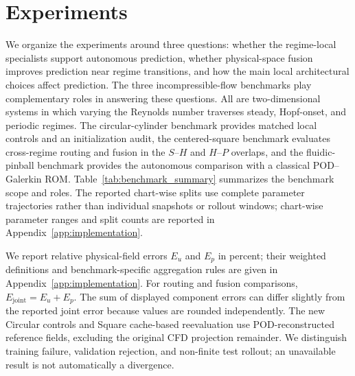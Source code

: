 \section{Experiments}
\label{sec:experiments}

We organize the experiments around three questions: whether the regime-local specialists support autonomous prediction, whether
physical-space fusion improves prediction near regime transitions, and how the main local architectural choices affect prediction.
The three incompressible-flow benchmarks play complementary roles in answering these questions. All are two-dimensional systems in which varying the Reynolds number traverses steady, Hopf-onset, and periodic regimes. The circular-cylinder benchmark provides matched local controls and an initialization audit, the centered-square benchmark evaluates cross-regime routing and fusion in the $S$--$H$ and $H$--$P$ overlaps, and the fluidic-pinball benchmark provides the autonomous comparison with a classical POD--Galerkin ROM. Table~\ref{tab:benchmark_summary} summarizes the benchmark scope and roles. The reported chart-wise splits use complete parameter trajectories rather than individual snapshots or rollout windows; chart-wise parameter ranges and split counts are reported in Appendix~\ref{app:implementation}.

We report relative physical-field errors $E_u$ and $E_p$ in percent; their weighted definitions and benchmark-specific aggregation rules are given in Appendix~\ref{app:implementation}. For routing and fusion comparisons, $E_{\mathrm{joint}}=E_u+E_p$. The sum of displayed component errors can differ slightly from the reported joint error because values are rounded independently. The new Circular controls and Square cache-based reevaluation use
POD-reconstructed reference fields, excluding the original CFD projection
remainder. We distinguish training failure, validation rejection, and
non-finite test rollout; an unavailable result is not automatically a
divergence. 

